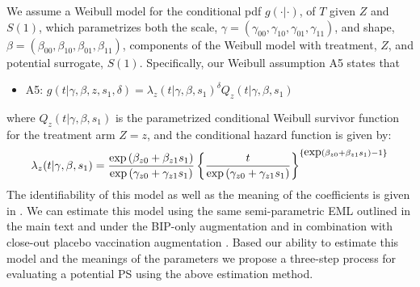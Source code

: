 \documentclass[times, 11pt]{article}
\begin{document}
We assume a Weibull model for the conditional pdf $g(\cdot|\cdot)$, of $T$ given $Z$ and $S(1)$, which parametrizes both the scale, $\gamma=(\gamma_{00}, \gamma_{10},\gamma_{01}, \gamma_{11})$, and shape, $\beta=(\beta_{00}, \beta_{10},\beta_{01}, \beta_{11})$, components of the Weibull model with treatment, $Z$, and potential surrogate, $S(1)$. Specifically, our Weibull assumption A5 states that 
\begin{itemize}
\item A5: $g(t|\gamma, \beta, z, s_1, \delta) =  \lambda_z(t|\gamma, \beta, s_1)^{\delta} Q_z(t|\gamma, \beta, s_1)$
\end{itemize}
where $Q_z(t|\gamma, \beta, s_1)$ is the parametrized conditional Weibull survivor function for the treatment arm $Z=z$, and the conditional hazard function is given by:
\begin{eqnarray} 
\lambda_z(t|\gamma, \beta, s_1)={\mbox{exp}\left(\beta_{z0} + \beta_{z1} s_1\right) \over \mbox{exp}\left(\gamma_{z0} + \gamma_{z1} s_1 \right)} \left\{{t \over \mbox{exp}\left(\gamma_{z0} +\gamma_{z1} s_1\right)} \right\}^{\{\mbox{exp}(\beta_{z0} + \beta_{z1} s_1)-1\}} \label{32}
\end{eqnarray}
The identifiability of this model as well as the meaning of the coefficients is given in \citet{Gabriel13}. We can estimate this model using the same semi-parametric EML outlined in the main text and under the BIP-only augmentation and in combination with close-out placebo vaccination augmentation \citep{Follmann06, Gilbert08, Huang11}. Based our ability to estimate this model and the meanings of the parameters we propose a three-step process for evaluating a potential PS using the above estimation method.
\end{document}
